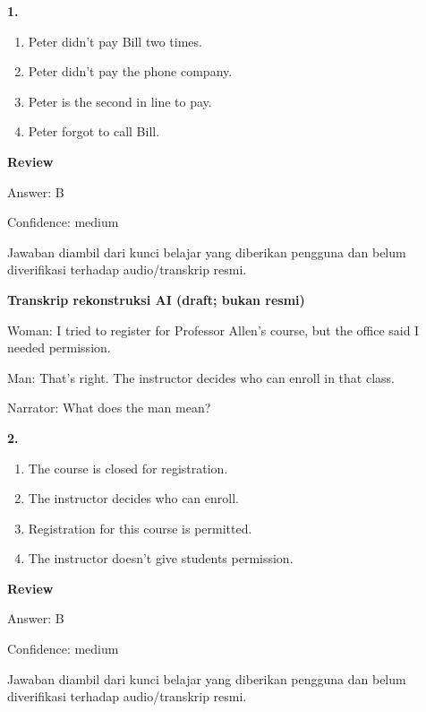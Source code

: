 \documentclass[12pt]{article}
\begin{document}
\noindent\textbf{1.}
\begin{enumerate}[label=(\Alph*),leftmargin=*,itemsep=0.2em]
\item Peter didn't pay Bill two times.
\item Peter didn't pay the phone company.
\item Peter is the second in line to pay.
\item Peter forgot to call Bill.
\end{enumerate}
\par
\begingroup
\setlength{\parskip}{0pt}
\setlength{\parindent}{0pt}
\textbf{Review}\par
Answer: B\par
Confidence: medium\par
Jawaban diambil dari kunci belajar yang diberikan pengguna dan belum diverifikasi terhadap audio/transkrip resmi.\par
\endgroup
\par
\vspace{0.25\baselineskip}
\begin{exampleblock}
\textbf{Transkrip rekonstruksi AI (draft; bukan resmi)}\par
Woman: I tried to register for Professor Allen's course, but the office said I needed permission.\par
Man: That's right. The instructor decides who can enroll in that class.\par
Narrator: What does the man mean?\par
\end{exampleblock}
\noindent\textbf{2.}
\begin{enumerate}[label=(\Alph*),leftmargin=*,itemsep=0.2em]
\item The course is closed for registration.
\item The instructor decides who can enroll.
\item Registration for this course is permitted.
\item The instructor doesn't give students permission.
\end{enumerate}
\par
\begingroup
\setlength{\parskip}{0pt}
\setlength{\parindent}{0pt}
\textbf{Review}\par
Answer: B\par
Confidence: medium\par
Jawaban diambil dari kunci belajar yang diberikan pengguna dan belum diverifikasi terhadap audio/transkrip resmi.\par
\endgroup
\end{document}
